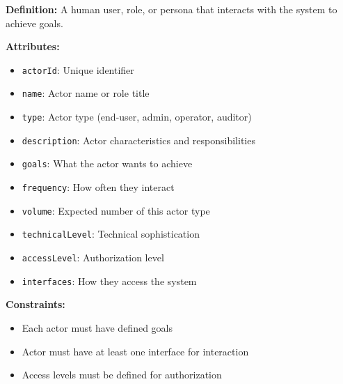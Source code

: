 \documentclass[11pt,letterpaper]{article}
\begin{document}
\begin{definitionbox}
\textbf{Definition:} A human user, role, or persona that interacts with the system to achieve goals.

\textbf{Attributes:}
\begin{itemize}[nosep]
    \item \texttt{actorId}: Unique identifier
    \item \texttt{name}: Actor name or role title
    \item \texttt{type}: Actor type (end-user, admin, operator, auditor)
    \item \texttt{description}: Actor characteristics and responsibilities
    \item \texttt{goals}: What the actor wants to achieve
    \item \texttt{frequency}: How often they interact
    \item \texttt{volume}: Expected number of this actor type
    \item \texttt{technicalLevel}: Technical sophistication
    \item \texttt{accessLevel}: Authorization level
    \item \texttt{interfaces}: How they access the system
\end{itemize}

\textbf{Constraints:}
\begin{itemize}[nosep]
    \item Each actor must have defined goals
    \item Actor must have at least one interface for interaction
    \item Access levels must be defined for authorization
\end{itemize}
\end{definitionbox}
\end{document}
